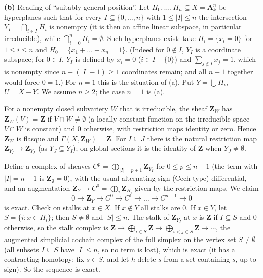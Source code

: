 \documentclass[11pt]{article}
\begin{document}
\textbf{(b)} Reading of ``suitably general position''. Let $H_0,\dots,H_n\subseteq X=\mathbf A^n_k$ be hyperplanes such that for every $I\subseteq\{0,\dots,n\}$ with $1\le|I|\le n$ the intersection $Y_I=\bigcap_{i\in I}H_i$ is nonempty (it is then an affine linear subspace, in particular irreducible), while $\bigcap_{i=0}^nH_i=\emptyset$. Such hyperplanes exist: take $H_i=\{x_i=0\}$ for $1\le i\le n$ and $H_0=\{x_1+\dots+x_n=1\}$. (Indeed for $0\notin I$, $Y_I$ is a coordinate subspace; for $0\in I$, $Y_I$ is defined by $x_i=0$ ($i\in I-\{0\}$) and $\sum_{j\notin I}x_j=1$, which is nonempty since $n-(|I|-1)\ge1$ coordinates remain; and all $n+1$ together would force $0=1$.) For $n=1$ this is the situation of (a). Put $Y=\bigcup H_i$, $U=X-Y$. We assume $n\ge2$; the case $n=1$ is (a).

For a nonempty closed subvariety $W$ that is irreducible, the sheaf $\mathbf Z_W$ has $\mathbf Z_W(V)=\mathbf Z$ if $V\cap W\neq\emptyset$ (a locally constant function on the irreducible space $V\cap W$ is constant) and $0$ otherwise, with restriction maps identity or zero. Hence $\mathbf Z_W$ is flasque and $\Gamma(X,\mathbf Z_W)=\mathbf Z$. For $I\subseteq J$ there is the natural restriction map $\mathbf Z_{Y_I}\to\mathbf Z_{Y_J}$ (as $Y_J\subseteq Y_I$); on global sections it is the identity of $\mathbf Z$ when $Y_J\ne\emptyset$.

Define a complex of sheaves $C^p=\bigoplus_{|I|=p+1}\mathbf Z_{Y_I}$ for $0\le p\le n-1$ (the term with $|I|=n+1$ is $\mathbf Z_\emptyset=0$), with the usual alternating-sign (Cech-type) differential, and an augmentation $\mathbf Z_Y\to C^0=\bigoplus_i\mathbf Z_{H_i}$ given by the restriction maps. We claim
\[
0\to\mathbf Z_Y\to C^0\to C^1\to\dots\to C^{n-1}\to0
\]
is exact. Check on stalks at $x\in X$. If $x\notin Y$ all stalks are $0$. If $x\in Y$, let $S=\{i:x\in H_i\}$; then $S\neq\emptyset$ and $|S|\le n$. The stalk of $\mathbf Z_{Y_I}$ at $x$ is $\mathbf Z$ if $I\subseteq S$ and $0$ otherwise, so the stalk complex is $\mathbf Z\to\bigoplus_{i\in S}\mathbf Z\to\bigoplus_{i<j\in S}\mathbf Z\to\cdots$, the augmented simplicial cochain complex of the full simplex on the vertex set $S\neq\emptyset$ (all subsets $I\subseteq S$ have $|I|\le n$, so no term is lost), which is exact (it has a contracting homotopy: fix $s\in S$, and let $h$ delete $s$ from a set containing $s$, up to sign). So the sequence is exact.
\end{document}
